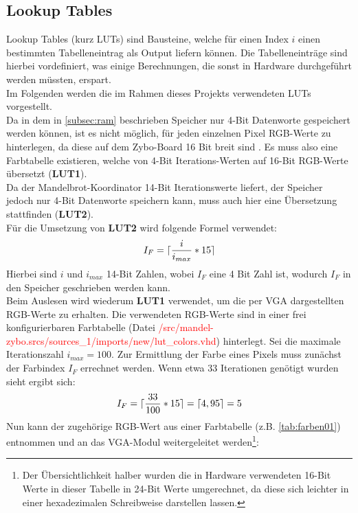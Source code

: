 \documentclass[a4paper,12pt,onesided]{report}
\begin{document}
\subsection{Lookup Tables}
\label{subsec:luts}
Lookup Tables (kurz LUTs) sind Bausteine, welche für einen Index $i$ einen bestimmten Tabelleneintrag als Output liefern können.
Die Tabelleneinträge sind hierbei vordefiniert, was einige Berechnungen, die sonst in Hardware durchgeführt werden müssten, erspart.\\
Im Folgenden werden die im Rahmen dieses Projekts verwendeten LUTs vorgestellt.\\
Da in dem in \autoref{subsec:ram} beschrieben Speicher nur 4-Bit Datenworte gespeichert werden können, ist es nicht möglich, für jeden einzelnen Pixel RGB-Werte zu hinterlegen, da diese auf dem Zybo-Board 16 Bit breit sind \cite{zyboref}. Es muss also eine Farbtabelle existieren, welche von 4-Bit Iterations-Werten auf 16-Bit RGB-Werte übersetzt (\textbf{LUT1}).\\
Da der Mandelbrot-Koordinator 14-Bit Iterationswerte liefert, der Speicher jedoch nur 4-Bit Datenworte speichern kann, muss auch hier eine Übersetzung stattfinden (\textbf{LUT2}).\\
Für die Umsetzung von \textbf{LUT2} wird folgende Formel verwendet:
\[I_F = \lceil\frac{i}{i_{max}}*15\rceil\]
Hierbei sind $i$ und $i_{max}$ 14-Bit Zahlen, wobei $I_F$ eine 4 Bit Zahl ist, wodurch $I_F$ in den Speicher geschrieben werden kann.\\
Beim Auslesen wird wiederum \textbf{LUT1} verwendet, um die per VGA dargestellten RGB-Werte zu erhalten.
Die verwendeten RGB-Werte sind in einer frei konfigurierbaren Farbtabelle (Datei \textcolor{red}{/src/mandel-zybo.srcs/sources\_1/imports/new/lut\_colors.vhd}) hinterlegt.
Sei die maximale Iterationszahl $i_{max} = 100$.
Zur Ermittlung der Farbe eines Pixels muss zunächst der Farbindex $I_F$ errechnet werden. Wenn etwa 33 Iterationen genötigt wurden sieht ergibt sich:
\[I_F = \lceil\frac{33}{100}*15\rceil = \lceil4,95\rceil = 5\]
Nun kann der zugehörige RGB-Wert aus einer Farbtabelle (z.B. \autoref{tab:farben01}) entnommen und an das VGA-Modul weitergeleitet werden\footnote{Der Übersichtlichkeit halber wurden die in Hardware verwendeten 16-Bit Werte in dieser Tabelle in 24-Bit Werte umgerechnet, da diese sich leichter in einer hexadezimalen Schreibweise darstellen lassen.}:
\end{document}
